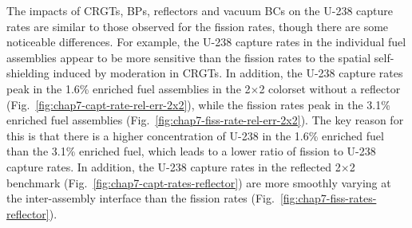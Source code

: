 
The impacts of \acp{CRGT}, \acp{BP}, reflectors and vacuum \acp{BC} on the U-238 capture rates are similar to those observed for the fission rates, though there are some noticeable differences. For example, the U-238 capture rates in the individual fuel assemblies appear to be more sensitive than the fission rates to the spatial self-shielding induced by moderation in \acp{CRGT}. In addition, the U-238 capture rates peak in the 1.6\% enriched fuel assemblies in the 2$\times$2 colorset without a reflector (Fig.~\ref{fig:chap7-capt-rate-rel-err-2x2}), while the fission rates peak in the 3.1\% enriched fuel assemblies (Fig.~\ref{fig:chap7-fiss-rate-rel-err-2x2}). The key reason for this is that there is a higher concentration of U-238 in the 1.6\% enriched fuel than the 3.1\% enriched fuel, which leads to a lower ratio of fission to U-238 capture rates. In addition, the U-238 capture rates in the reflected 2$\times$2 benchmark (Fig.~\ref{fig:chap7-capt-rates-reflector}) are more smoothly varying at the inter-assembly interface than the fission rates (Fig.~\ref{fig:chap7-fiss-rates-reflector}).

